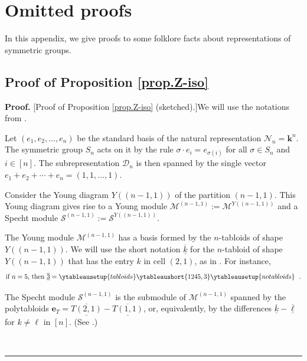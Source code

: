 \documentclass[numbers=enddot,12pt,final,onecolumn,notitlepage]{scrartcl}%
\theoremstyle{definition}
\newenvironment{proof}[1][Proof]{\noindent\textbf{#1.} }{\ \rule{0.5em}{0.5em}}
\begin{document}
\appendix


\section{\label{sec.apx.proofs}Omitted proofs}

In this appendix, we give proofs to some folklore facts about representations
of symmetric groups.

\subsection{\label{subsec.apx.pf.prop.Z-iso}Proof of Proposition
\ref{prop.Z-iso}}

\begin{proof}
[Proof of Proposition \ref{prop.Z-iso} (sketched).]We will use the notations
from \cite{sga}.

Let $\left(  e_{1},e_{2},\ldots,e_{n}\right)  $ be the standard basis of the
natural representation $\mathcal{N}_{n}=\mathbf{k}^{n}$. The symmetric group
$S_{n}$ acts on it by the rule $\sigma\cdot e_{i}=e_{\sigma\left(  i\right)
}$ for all $\sigma\in S_{n}$ and $i\in\left[  n\right]  $. The
subrepresentation $\mathcal{D}_{n}$ is then spanned by the single vector
$e_{1}+e_{2}+\cdots+e_{n}=\left(  1,1,\ldots,1\right)  $.

Consider the Young diagram $Y\left(  \left(  n-1,1\right)  \right)  $ of the
partition $\left(  n-1,1\right)  $. This Young diagram gives rise to a Young
module $\mathcal{M}^{\left(  n-1,1\right)  }:=\mathcal{M}^{Y\left(  \left(
n-1,1\right)  \right)  }$ and a Specht module $\mathcal{S}^{\left(
n-1,1\right)  }:=\mathcal{S}^{Y\left(  \left(  n-1,1\right)  \right)  }$.

The Young module $\mathcal{M}^{\left(  n-1,1\right)  }$ has a basis formed by
the $n$-tabloids of shape $Y\left(  \left(  n-1,1\right)  \right)  $. We will
use the short notation $\underline{\overline{k}}$ for the $n$-tabloid of shape
$Y\left(  \left(  n-1,1\right)  \right)  $ that has the entry $k$ in cell
$\left(  2,1\right)  $, as in \cite[Example 5.3.16]{sga}. For instance,%
\[
\text{if }n=5\text{, then }\underline{\overline{3}}%
=\ytableausetup{tabloids}\ytableaushort{1245,3}\ytableausetup{notabloids}\ \ .
\]


The Specht module $\mathcal{S}^{\left(  n-1,1\right)  }$ is the submodule of
$\mathcal{M}^{\left(  n-1,1\right)  }$ spanned by the polytabloids
$\mathbf{e}_{T}=\underline{\overline{T\left(  2,1\right)  }}%
-\underline{\overline{T\left(  1,1\right)  }}$, or, equivalently, by the
differences $\underline{\overline{k}}-\underline{\overline{\ell}}$ for
$k\neq\ell$ in $\left[  n\right]  $. (See \cite[Example 5.4.2]{sga}.)


\end{proof}
\end{document}
